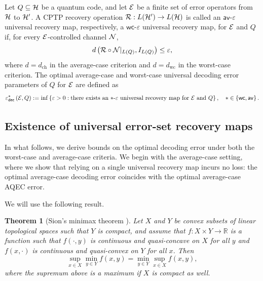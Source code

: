 \documentclass[10pt]{article}
\newtheorem*{theorem*}{Theorem}
\newcommand{\R}{\mathbb{R}}
\newcommand{\p}[1]{\left(#1\right)}
\newcommand{\ppp}[1]{\left\{#1\right\}}
\newcommand{\s}[1]{\mathsf{#1}}
\begin{document}
\begin{definition}\label{def:universal_decoder} Let $Q\subseteq{\cal H}$ be a quantum code, and let ${\cal E}$ be a finite set of error operators from ${\cal H}$ to ${\cal H}'$. A CPTP recovery operation ${\cal R}:L({\cal H}')\to L({\cal H})$ is called an $\s{av}$-$\varepsilon$ universal recovery map, respectively, a $\s{wc}$-$\varepsilon$ universal recovery map, for ${\cal E}$ and $Q$ if, for every ${\cal E}$-controlled channel ${\cal N}$, \begin{equation} d\p{\calR\circ\calN|_{L(Q)},I_{L(Q)}}\leq\varepsilon, \label{eq:universal_decoder} \end{equation} where $d=d_{\mathrm{ch}}$ in the average-case criterion and $d=d_{\mathrm{wc}}$ in the worst-case criterion. 
The optimal average-case and worst-case universal decoding error parameters of $Q$ for ${\cal E}$ are defined as       \begin{equation} 
\varepsilon_{\s{dec}}^{\s{*}}\p{\calE,Q} := \inf\ppp{\varepsilon>0: \text{there exists an $\s{*}$-$\varepsilon$ universal recovery map for $\calE$ and $Q$}},\quad \s{*}\in \ppp{\s{wc},\s{av}}.\label{eq:optimal_universal_decoding_errors} 
    \end{equation} 
\end{definition} 

\subsection{Existence of universal error-set recovery maps}
In what follows, we derive bounds on the optimal decoding error under both the worst-case and average-case criteria. We begin with the average-case setting, where we show that relying on a single universal recovery map incurs no loss: the optimal average-case decoding error coincides with the optimal average-case AQEC error.

We will use the following result.
\begin{theorem*}[Sion's minimax theorem {\cite{Sion1958}}]
    Let $X$ and $Y$ be convex subsets of linear topological spaces such that $Y$ is compact, and assume that $f:X\times Y\to \R$ is a function such that $f(\cdot,y)$ is continuous and quasi-concave on $X$ for all $y$ and $f(x,\cdot)$ is  continuous and quasi-convex on $Y$ for all $x$. Then 
     \[
     \sup_{x\in X}\min_{y\in Y} f(x,y)=\min_{y\in Y}  \sup_{x\in X}f(x,y),
     \]
    where the supremum above is a maximum if $X$ is compact as well.
\end{theorem*}
\end{document}
